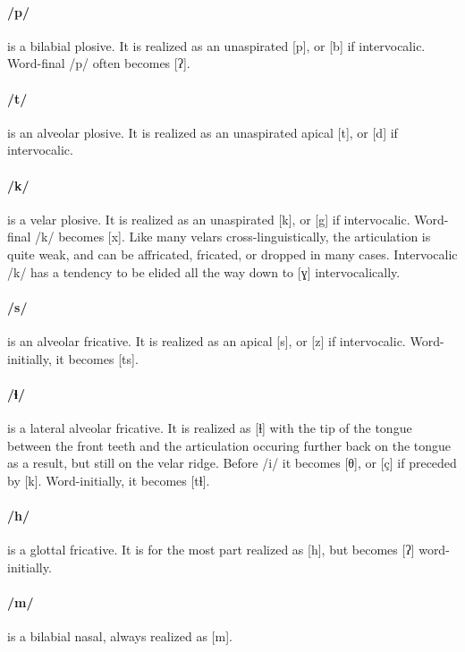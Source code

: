 \documentclass[smallroyalvopaper,9pt]{memoir}
\newcommand{\bind}{\symbol{"0361}}
\begin{document}
\paragraph{/p/} is a bilabial plosive. It is realized as an unaspirated [p], or [b] if intervocalic. Word-final /p/ often becomes [ʔ].

\paragraph{/t/} is an alveolar plosive. It is realized as an unaspirated apical [t], or [d] if intervocalic.

\paragraph{/k/} is a velar plosive. It is realized as an unaspirated [k], or [g] if intervocalic. Word-final /k/ becomes [x]. Like many velars cross-linguistically, the articulation is quite weak, and can be affricated, fricated, or dropped in many cases. Intervocalic /k/ has a tendency to be elided all the way down to [ɣ] intervocalically.

\paragraph{/s/} is an alveolar fricative. It is realized as an apical [s], or [z] if intervocalic. Word-initially, it becomes [t\bind{}s].

\paragraph{/ɬ/} is a lateral alveolar fricative. It is realized as [ɬ] with the tip of the tongue between the front teeth and the articulation occuring further back on the tongue as a result, but still on the velar ridge. Before /i/ it becomes [θ], or [ç] if preceded by [k]. Word-initially, it becomes [t\bind{}ɬ].

\paragraph{/h/} is a glottal fricative. It is for the most part realized as [h], but becomes [ʔ] word-initially.

\paragraph{/m/} is a bilabial nasal, always realized as [m].
\end{document}
